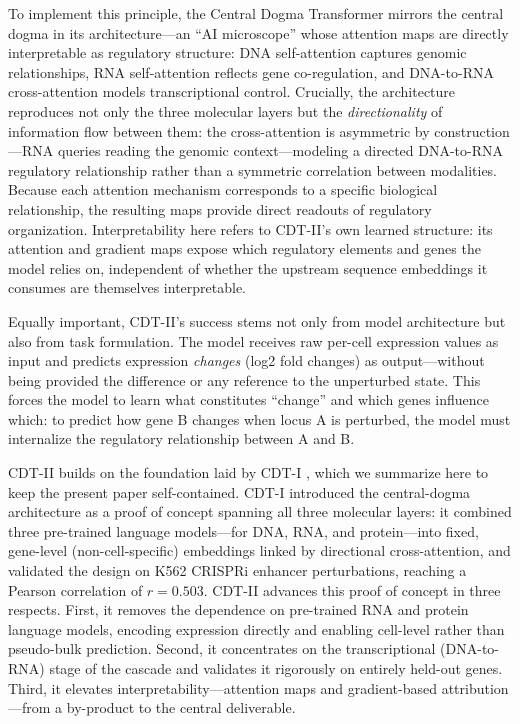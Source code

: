 \documentclass[12pt,a4paper]{article}
\begin{document}
To implement this principle, the Central Dogma Transformer \citep{ota2026cdtv1} mirrors the central dogma in its architecture---an ``AI microscope'' whose attention maps are directly interpretable as regulatory structure: DNA self-attention captures genomic relationships, RNA self-attention reflects gene co-regulation, and DNA-to-RNA cross-attention models transcriptional control. Crucially, the architecture reproduces not only the three molecular layers but the \textit{directionality} of information flow between them: the cross-attention is asymmetric by construction---RNA queries reading the genomic context---modeling a directed DNA-to-RNA regulatory relationship rather than a symmetric correlation between modalities. Because each attention mechanism corresponds to a specific biological relationship, the resulting maps provide direct readouts of regulatory organization. Interpretability here refers to CDT-II's own learned structure: its attention and gradient maps expose which regulatory elements and genes the model relies on, independent of whether the upstream sequence embeddings it consumes are themselves interpretable.

Equally important, CDT-II's success stems not only from model architecture but also from task formulation. The model receives raw per-cell expression values as input and predicts expression \textit{changes} (log2 fold changes) as output---without being provided the difference or any reference to the unperturbed state. This forces the model to learn what constitutes ``change'' and which genes influence which: to predict how gene B changes when locus A is perturbed, the model must internalize the regulatory relationship between A and B.

CDT-II builds on the foundation laid by CDT-I \citep{ota2026cdtv1}, which we summarize here to keep the present paper self-contained. CDT-I introduced the central-dogma architecture as a proof of concept spanning all three molecular layers: it combined three pre-trained language models---for DNA, RNA, and protein---into fixed, gene-level (non-cell-specific) embeddings linked by directional cross-attention, and validated the design on K562 CRISPRi enhancer perturbations, reaching a Pearson correlation of $r = 0.503$.
CDT-II advances this proof of concept in three respects. First, it removes the dependence on pre-trained RNA and protein language models, encoding expression directly and enabling cell-level rather than pseudo-bulk prediction. Second, it concentrates on the transcriptional (DNA-to-RNA) stage of the cascade and validates it rigorously on entirely held-out genes. Third, it elevates interpretability---attention maps and gradient-based attribution---from a by-product to the central deliverable.
\end{document}
